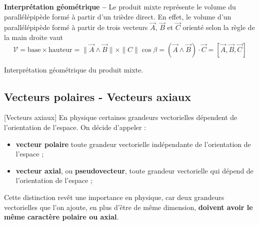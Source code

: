 \textbf{Interprétation géométrique --} Le produit mixte représente le volume du parallélépipède formé à partir d'un trièdre direct.  En effet, le volume d'un parallélépipède formé à partir de trois vecteurs $\overrightarrow{A}$, $\overrightarrow{B}$ et $\overrightarrow{C}$ orienté selon la règle de la main droite vaut 
\[
	\mathcal{V}=\text{base}\times \text{hauteur}=\|\overrightarrow{A}\wedge \overrightarrow{B}\|\times \|C\|\cos\beta=(\overrightarrow{A}\wedge \overrightarrow{B})\cdot \overrightarrow{C}=[\overrightarrow{A},\overrightarrow{B},\overrightarrow{C}]
\]
\begin{marginfigure}[*-8]
\centering
{} 
\caption{Interprétation géométrique du produit mixte.}
\end{marginfigure}

\subsection{Vecteurs polaires - Vecteurs axiaux}[Vecteurs axiaux] %
En physique certaines grandeurs vectorielles dépendent de l'orientation de l'espace. On décide d'appeler :
\begin{itemize}
	\item \textbf{vecteur polaire} toute grandeur vectorielle indépendante de l'orientation de l'espace ;
	\item \textbf{vecteur axial}, ou \textbf{pseudovecteur}, toute grandeur vectorielle qui dépend de l'orientation de l'espace ; 
\end{itemize}
Cette distinction revêt une importance en physique, car deux grandeurs vectorielles que l'on ajoute, en plus d'être de même dimension, \textbf{doivent avoir le même caractère polaire ou axial}. 

